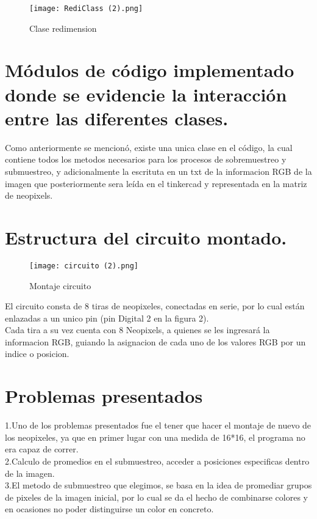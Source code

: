 \documentclass{article}
\begin{document}
\begin{figure}[H]
    \centering
    \texttt{[image: RediClass (2).png]} 
    \caption{Clase redimension}
    \label{Parcial 2}
\end{figure}

\section{Módulos de código implementado donde se evidencie la interacción entre las
diferentes clases.} \label{Descripción}
Como anteriormente se mencionó, existe una unica clase en el código, la cual contiene todos los metodos necesarios para los procesos de sobremuestreo y submuestreo, y adicionalmente la escrituta en un txt de la informacion RGB de la imagen que posteriormente sera leída en el tinkercad y representada en la matriz de neopixels.\\

\section{Estructura del circuito montado.} \label{Descripción}
\begin{figure}[H]
    \centering
    \texttt{[image: circuito (2).png]}
    \caption{Montaje circuito}
    \label{Info 2}
\end{figure}

El circuito consta de 8 tiras de neopixeles, conectadas en serie, por lo cual están enlazadas a un unico pin (pin Digital 2 en la figura 2).\\
Cada tira a su vez  cuenta con 8 Neopixels, a quienes se les ingresará la informacion RGB, guiando la asignacion de cada uno de los valores RGB por un indice o posicion. \\
\section{Problemas presentados} \label{Descripción}
1.Uno de los problemas presentados fue el tener que hacer el montaje de nuevo de los neopixeles, ya que en primer lugar con una medida de 16*16, el programa no era capaz de correr.\\

2.Calculo de promedios en el submuestreo, acceder a posiciones especificas dentro de la imagen.\\

3.El metodo de submuestreo  que elegimos, se basa en la idea de promediar grupos de pixeles de la imagen inicial, por lo cual se da el hecho de combinarse colores y en ocasiones no poder distinguirse un color en concreto.\\
\end{document}
